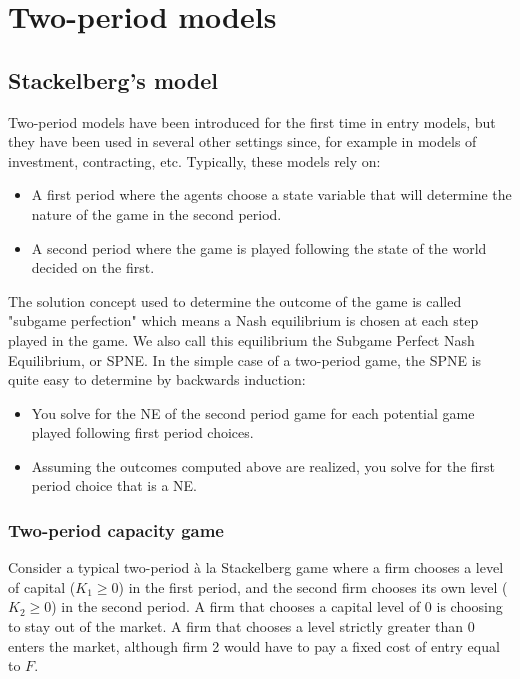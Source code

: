 \documentclass[12pt]{report}
\begin{document}
\section{Two-period models}

\subsection{Stackelberg's model}

Two-period models have been introduced for the first time in entry models, but they have been used in several other settings since, for example in models of investment, contracting, etc. Typically, these models rely on:\begin{itemize}
\item A first period where the agents choose a state variable that will determine the nature of the game in the second period.
\item A second period where the game is played following the state of the world decided on the first.
\end{itemize}
The solution concept used to determine the outcome of the game is called "subgame perfection" which means a Nash equilibrium is chosen at each step played in the game. We also call this equilibrium the Subgame Perfect Nash Equilibrium, or SPNE. In the simple case of a two-period game, the SPNE is quite easy to determine by backwards induction:\begin{itemize}
\item You solve for the NE of the second period game for each potential game played following first period choices.
\item Assuming the outcomes computed above are realized, you solve for the first period choice that is a NE.
\end{itemize}

\subsubsection{Two-period capacity game}

Consider a typical two-period à la Stackelberg game where a firm chooses a level of capital ($K_1 \geq 0$) in the first period, and the second firm chooses its own level ($K_2 \geq 0$) in the second period. A firm that chooses a capital level of $0$ is choosing to stay out of the market. A firm that chooses a level strictly greater than 0 enters the market, although firm 2 would have to pay a fixed cost of entry equal to $F$.
\end{document}
